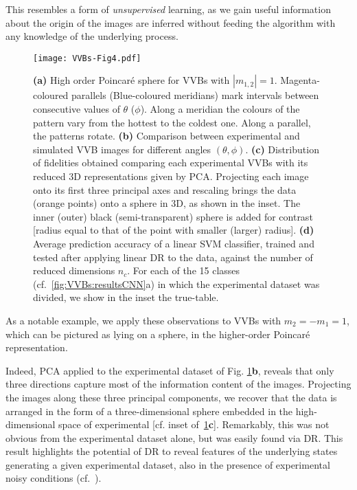 This resembles a form of \emph{unsupervised} learning, as we gain useful information about the origin of the images are inferred without feeding the algorithm with any knowledge of the underlying process.
 
\begin{figure}[t]
    \centering
    \texttt{[image: VVBs-Fig4.pdf]}
    \caption{
		\textbf{(a)} High order Poincar\'e sphere for \acp{VVB} with $|m_{1,2}|=1$. Magenta-coloured parallels (Blue-coloured meridians) mark intervals between consecutive values of $\theta$ ($\phi$). 
		Along a meridian the colours of the pattern vary from the hottest to the coldest one. Along a parallel, the patterns rotate. 
		\textbf{(b)}
		Comparison between experimental and simulated \ac{VVB} images for different angles $(\theta, \phi)$.
		\textbf{(c)}
		Distribution of fidelities obtained comparing each experimental VVBs with its reduced 3D representations given by PCA. Projecting each image onto its first three principal axes and rescaling brings the data (orange points) onto a sphere in 3D, as shown in the inset. The inner (outer) black (semi-transparent) sphere is added for contrast [radius equal to that of the point with smaller (larger) radius].
		\textbf{(d)}
		Average prediction accuracy of a linear \ac{SVM} classifier, trained and tested after applying linear DR to the data, against the number of reduced dimensions $n_c$.
		For each of the 15 classes (cf.~\cref{fig:VVBs:resultsCNN}a) in which the experimental dataset was divided, we show in the inset the true-table. 
    }%
    \label{fig:VVBs:PCAresults}
\end{figure}


As a notable example, we apply these observations to \acp{VVB} with $m_2=-m_1=1$, which can be pictured as lying on a sphere, in the higher-order Poincar\'e representation. 

Indeed, \ac{PCA} applied to the experimental dataset of Fig. \ref{fig:VVBs:PCAresults}{\bf b}, 
reveals that only three directions capture most of the information content of the images. Projecting the images along these three principal components, we recover that the data is arranged in the form of a three-dimensional sphere embedded in the high-dimensional space of experimental [cf. inset of~\cref{fig:VVBs:PCAresults}{\bf c}].
Remarkably, this was not obvious from the experimental dataset alone, but was easily found via \ac{DR}. This result highlights the potential of {\ac{DR}} to  reveal features of the underlying states generating a given experimental dataset, also in the presence of experimental noisy conditions (cf.~\cite{SI}).


